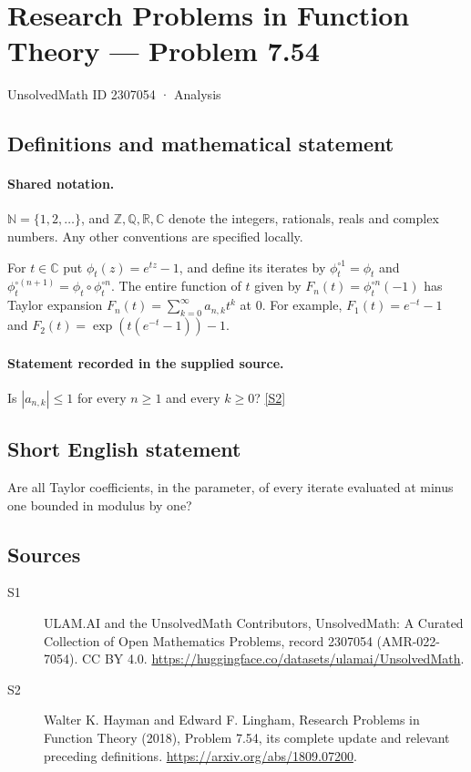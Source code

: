 \documentclass[11pt]{article}
\newcommand{\sref}[2]{\hyperlink{source:#1:#2}{[S#2]}}
\begin{document}
\setcounter{section}{2307053}
\section{Research Problems in Function Theory — Problem 7.54}\label{2307054}
{\small\sffamily UnsolvedMath ID 2307054 · Analysis}
\subsection{Definitions and mathematical statement}

\paragraph{Shared notation.}$\mathbb N=\{1,2,\ldots\}$, and $\mathbb Z,\mathbb Q,\mathbb R,\mathbb C$ denote the integers, rationals, reals and complex numbers. Any other conventions are specified locally.


For $t\in\mathbb C$ put $\phi_t(z)=e^{tz}-1$, and define its iterates by $\phi_t^{\circ1}=\phi_t$ and $\phi_t^{\circ(n+1)}=\phi_t\circ\phi_t^{\circ n}$. The entire function of $t$ given by $F_n(t)=\phi_t^{\circ n}(-1)$ has Taylor expansion $F_n(t)=\sum_{k=0}^\infty a_{n,k}t^k$ at $0$. For example, $F_1(t)=e^{-t}-1$ and $F_2(t)=\exp(t(e^{-t}-1))-1$.
\paragraph{Statement recorded in the supplied source.}
Is $|a_{n,k}|\le1$ for every $n\ge1$ and every $k\ge0$? \sref{2307054}{2}
\subsection{Short English statement}
Are all Taylor coefficients, in the parameter, of every iterate evaluated at minus one bounded in modulus by one?
\subsection{Sources}
\begin{description}
\item[\hypertarget{source:2307054:1}{S1}] ULAM.AI and the UnsolvedMath Contributors, UnsolvedMath: A Curated Collection of Open Mathematics Problems, record 2307054 (AMR-022-7054). CC BY 4.0. \url{https://huggingface.co/datasets/ulamai/UnsolvedMath}.
\item[\hypertarget{source:2307054:2}{S2}] Walter K. Hayman and Edward F. Lingham, Research Problems in Function Theory (2018), Problem 7.54, its complete update and relevant preceding definitions. \url{https://arxiv.org/abs/1809.07200}.
\end{description}
\label{end:2307054}
\end{document}

